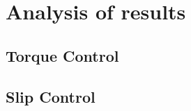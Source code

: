 \chapter{Analysis of results}
\label{Ch:Results}
%
\section{Torque Control}
%
\section{Slip Control}
%